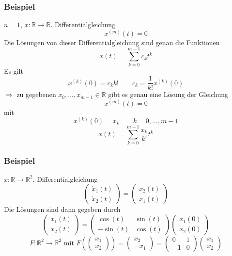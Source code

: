 \subsubsection{Beispiel} %
\label{ssub:beispiel}
$n=1$, $x:\mathbb{R} \to \mathbb{R}$. Differentialgleichung
\[
	x^{(m)}(t)=0
\]
Die Lösungen von dieser Differentialgleichung sind genau die Funktionen
\[
	x(t)= \sum_{k=0}^{m-1}c_kt^k
\]
Es gilt
\[
	x^{(k)}(0)=c_k k! \qquad c_k = \frac{1}{k!}x^{(k)}(0)
\]
$\Rightarrow $ zu gegebenen $x_0, \dots, x_{m-1} \in \mathbb{R}$ gibt es genau eine Lösung der Gleichung
\[
	x^{(m)}(t)=0
\]
mit \[
	x^{(k)}(0)=x_k \qquad k= 0, \dots, m-1
\]
\[
	x(t)= \sum_{k=0}^{m-1}\frac{x_k}{k!}t^k
\]
\subsubsection{Beispiel} %
\label{ssub:beispiel}
$x: \mathbb{R} \to \mathbb{R}^2$. Differentialgleichung
\[
	\begin{pmatrix}
		\dot x_1(t) \\ \dot x_2(t)
	\end{pmatrix} = \begin{pmatrix}
		x_2(t) \\ x_1(t)
	\end{pmatrix}
\]
Die Lösungen sind dann gegeben durch
\[
	\begin{pmatrix}
		x_1(t) \\ x_2(t)
	\end{pmatrix} = \begin{pmatrix}
		\cos(t) & \sin(t) \\ -\sin(t) & \cos(t)
	\end{pmatrix}\begin{pmatrix}
		x_1(0) \\ x_2(0)
	\end{pmatrix}
\]
\[
	F:\mathbb{R}^2 \to \mathbb{R}^2 \text{ mit } F \left( \begin{pmatrix}
		x_1 \\ x_2
	\end{pmatrix} \right) = \begin{pmatrix}
		x_2 \\ -x_1
	\end{pmatrix} = \begin{pmatrix}
		0 & 1 \\ -1 & 0
	\end{pmatrix}\begin{pmatrix}
		x_1 \\ x_2
	\end{pmatrix}
\]
